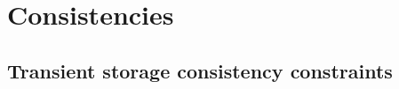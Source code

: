 

\section{Consistencies}                                                      \label{hub: consistencies}
\subsection{Transient storage     consistency constraints \lispTodo{}}       \label{hub: consistencies: transient storage}       \newpage
